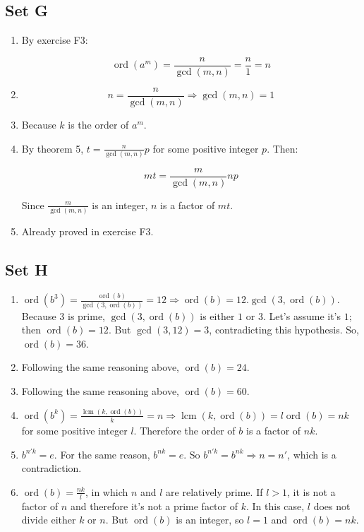 \documentclass{article}
\DeclareMathOperator{\ord}{ord}
\DeclareMathOperator{\lcm}{lcm}
\begin{document}
\subsection{Set G}
\begin{enumerate}
    \item By exercise F3:

    $$ \ord(a^m) = \frac{n}{\gcd(m, n)} = \frac{n}{1} = n$$

    \item $$ n = \frac{n}{\gcd(m, n)} \Rightarrow \gcd(m, n) = 1$$

    \item Because $ k $ is the order of $ a^m $.

    \item By theorem 5, $ t = \frac{n}{\gcd(m, n)}p $ for some positive integer $ p $. Then:

    $$ mt = \frac{m}{\gcd(m, n)}np $$ 

    Since $ \frac{m}{\gcd(m, n)} $ is an integer, $ n $ is a factor of $ mt $.

    \item Already proved in exercise F3.
\end{enumerate}

\subsection{Set H}
\begin{enumerate}
    \item $ \ord(b^3) = \frac{\ord(b)}{\gcd(3, \ord(b))} = 12 \Rightarrow \ord(b) = 12.\gcd(3, \ord(b)) $. Because $ 3 $ is prime, $ \gcd(3, \ord(b)) $ is either $ 1 $ or $ 3 $. Let's assume it's $ 1 $; then $ \ord(b) = 12 $. But $ \gcd(3, 12) = 3 $, contradicting this hypothesis. So, $ \ord(b) = 36 $.

    \item Following the same reasoning above, $ \ord(b) = 24 $.

    \item Following the same reasoning above, $ \ord(b) = 60 $.

    \item $ \ord(b^k) = \frac{\lcm(k, \ord(b))}{k} = n \Rightarrow \lcm(k, \ord(b)) = l\ord(b) = nk $ for some positive integer $ l $. Therefore the order of $ b $ is a factor of $ nk $.

    \item $ b^{n'k}  = e$. For the same reason, $ b^{nk} = e $. So $ b^{n'k} = b^{nk} \Rightarrow n = n' $, which is a contradiction.

    \item $ \ord(b) = \frac{nk}{l} $, in which $ n $ and $ l $ are relatively prime. If $ l > 1 $, it is not a factor of $ n $ and therefore it's not a prime factor of $ k $. In this case, $ l $ does not divide either $ k $ or $ n $. But $ \ord(b) $ is an integer, so $ l = 1 $ and $ \ord(b) = nk $.
\end{enumerate}
\end{document}

